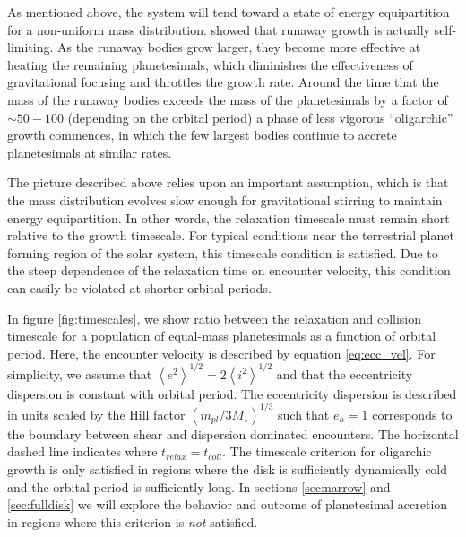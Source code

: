 \documentclass[twocolumn]{aastex63}
\begin{document}
As mentioned above, the system will tend toward a state of energy
equipartition for a non-uniform mass distribution. \citet{kokubo98}
showed that runaway growth is actually self-limiting. As the runaway
bodies grow larger, they become more effective at heating the
remaining planetesimals, which diminishes the effectiveness of
gravitational focusing and throttles the growth rate. Around the time
that the mass of the runaway bodies exceeds the mass of the planetesimals
by a factor of $\sim 50-100$ (depending on the orbital period)
\citep{ida93} a phase of less vigorous ``oligarchic'' 
growth commences, in which the few largest bodies continue to 
accrete planetesimals at similar rates.

The picture described above relies upon an important assumption, which is that the mass distribution evolves slow enough for gravitational stirring to maintain energy equipartition. In other words, the relaxation timescale must remain short relative to the growth timescale. For typical conditions near the terrestrial planet forming region of the solar system, this timescale condition is satisfied. Due to the steep dependence of the relaxation time on encounter velocity, this condition can easily be violated at shorter orbital periods.

In figure \ref{fig:timescales}, we show ratio between the relaxation
and collision timescale for a population of equal-mass planetesimals
as a function of orbital period. Here, the encounter velocity is
described by equation \ref{eq:ecc_vel}. For
simplicity, we assume that $\left< e^2 \right>^{1/2} = 2\left< i^2
\right>^{1/2}$ \citep{ida93a} and that the eccentricity dispersion is
constant with orbital period. The eccentricity dispersion is described
in units scaled by the Hill factor $\left( m_{pl}/ 3 M_{\star}
\right)^{1/3}$ such that $e_{h} = 1$ corresponds to the boundary
between shear and dispersion dominated encounters. The horizontal
dashed line indicates where $t_{relax} = t_{coll}$. The timescale
criterion for oligarchic growth is only satisfied in regions where the
disk is sufficiently dynamically cold and the orbital period is
sufficiently long. In sections \ref{sec:narrow} and \ref{sec:fulldisk}
we will explore the behavior and outcome of planetesimal accretion in regions where this criterion is \textit{not} satisfied. 
\end{document}
